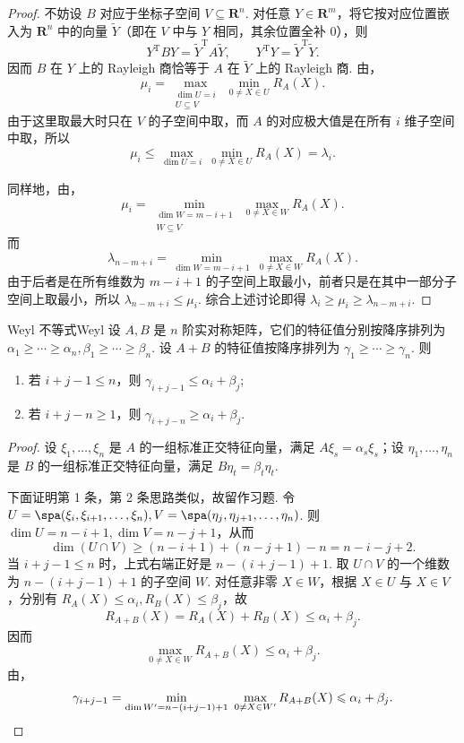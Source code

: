 \begin{proof}
    不妨设 $B$ 对应于坐标子空间 $V\subseteq \mathbf{R}^n$. 对任意 $Y\in\mathbf{R}^m$，将它按对应位置嵌入为 $\mathbf{R}^n$ 中的向量 $\widetilde{Y}$（即在 $V$ 中与 $Y$ 相同，其余位置全补 $0$），则
    \[
        Y^\mathrm{T}BY=\widetilde{Y}^\mathrm{T}A\widetilde{Y}, \qquad Y^\mathrm{T}Y=\widetilde{Y}^\mathrm{T}\widetilde{Y}.
    \]
    因而 $B$ 在 $Y$ 上的 Rayleigh 商恰等于 $A$ 在 $\widetilde{Y}$ 上的 Rayleigh 商. 由，
    \[
        \mu_i=\max_{\substack{\dim U=i \\ U\subseteq V}}\ \min_{0\neq X\in U}R_A(X).
    \]
    由于这里取最大时只在 $V$ 的子空间中取，而 $A$ 的对应极大值是在所有 $i$ 维子空间中取，所以
    \[
        \mu_i\leqslant \max_{\dim U=i}\ \min_{0\neq X\in U}R_A(X)=\lambda_i.
    \]

    同样地，由，
    \[
        \mu_i=\min_{\substack{\dim W=m-i+1 \\ W\subseteq V}}\ \max_{0\neq X\in W}R_A(X).
    \]
    而
    \[
        \lambda_{n-m+i}=\min_{\dim W=m-i+1}\ \max_{0\neq X\in W}R_A(X).
    \]
    由于后者是在所有维数为 $m-i+1$ 的子空间上取最小，前者只是在其中一部分子空间上取最小，所以 $\lambda_{n-m+i}\leqslant \mu_i$. 综合上述讨论即得 $\lambda_i\geqslant \mu_i\geqslant \lambda_{n-m+i}$.
\end{proof}

\begin{theorem}{Weyl 不等式}{Weyl}
    设 $A,B$ 是 $n$ 阶实对称矩阵，它们的特征值分别按降序排列为 $\alpha_1\geqslant \cdots \geqslant \alpha_n, \beta_1\geqslant \cdots \geqslant \beta_n$. 设 $A+B$ 的特征值按降序排列为 $\gamma_1\geqslant \cdots \geqslant \gamma_n$. 则
    \begin{enumerate}
        \item 若 $i+j-1\leqslant n$，则 $\gamma_{i+j-1}\leqslant \alpha_i+\beta_j$;
        \item 若 $i+j-n\geqslant 1$，则 $\gamma_{i+j-n}\geqslant \alpha_i+\beta_j$.
    \end{enumerate}
\end{theorem}

\begin{proof}
    设 $\xi_1,\ldots,\xi_n$ 是 $A$ 的一组标准正交特征向量，满足 $A\xi_s=\alpha_s\xi_s$；设 $\eta_1,\ldots,\eta_n$ 是 $B$ 的一组标准正交特征向量，满足 $B\eta_t=\beta_t\eta_t$.

    下面证明第 1 条，第 2 条思路类似，故留作习题. 令 $U=\spa(\xi_i,\xi_{i+1},\ldots,\xi_n), V=\spa(\eta_j,\eta_{j+1},\ldots,\eta_n)$. 则 $\dim U=n-i+1, \dim V=n-j+1$，从而
    \[ \dim(U\cap V)\geqslant (n-i+1)+(n-j+1)-n=n-i-j+2. \]
    当 $i+j-1\leqslant n$ 时，上式右端正好是 $n-(i+j-1)+1$. 取 $U\cap V$ 的一个维数为 $n-(i+j-1)+1$ 的子空间 $W$. 对任意非零 $X\in W$，根据 $X\in U$ 与 $X\in V$，分别有 $R_A(X)\leqslant \alpha_i, R_B(X)\leqslant \beta_j$，故
    \[
        R_{A+B}(X)=R_A(X)+R_B(X)\leqslant \alpha_i+\beta_j.
    \]
    因而
    \[
        \max_{0\neq X\in W}R_{A+B}(X)\leqslant \alpha_i+\beta_j.
    \]
    由，
    \[
        \gamma_{i+j-1}=\min_{\dim W'=n-(i+j-1)+1}\ \max_{0\neq X\in W'}R_{A+B}(X)\leqslant \alpha_i+\beta_j. \qedhere
    \]
\end{proof}

